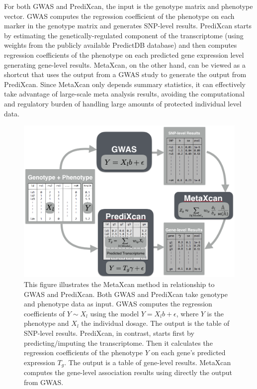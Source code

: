 \documentclass[10pt]{article}
\begin{document}
For both GWAS and PrediXcan, the input is the genotype matrix and phenotype vector. GWAS computes the regression coefficient of the phenotype on each marker in the genotype matrix and generates SNP-level results. PrediXcan starts by estimating the genetically-regulated component of the transcriptome (using weights from the publicly available PredictDB database) and then computes regression coefficients of the phenotype on each predicted gene expression level generating gene-level results. MetaXcan, on the other hand,  can be viewed as a shortcut that uses the output from a GWAS study to generate the output from PrediXcan. Since MetaXcan only depends summary statistics, it can effectively take advantage of large-scale meta analysis results, avoiding the computational and regulatory burden of handling large amounts of protected individual level data.
%
%
%
%

\begin{figure}
\includegraphics[width=\textwidth]{plots/Fig1-MetaXcan-PrediXcan-GWAS.png}
\caption{This figure illustrates the MetaXcan method in relationship to GWAS and PrediXcan. Both GWAS and PrediXcan take genotype and phenotype data as input. GWAS computes the regression coefficients of $Y\sim X_l$ using the model $Y=X_l b + \epsilon$, where $Y$ is the phenotype and $X_l$ the individual dosage. The output is the table of SNP-level results. PrediXcan, in contrast, starts first by predicting/imputing the transcriptome. Then it calculates the regression coefficients of the phenotype $Y$ on each gene's predicted expression $T_g$. The output is a table of gene-level results. MetaXcan computes the gene-level association results using directly the output from GWAS.} %
\label{fig:MetaXcan-PrediXcan-GWAS}
\end{figure}
\end{document}
